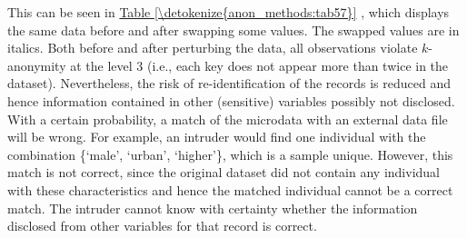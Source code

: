 \documentclass[letterpaper,10pt,english]{sphinxmanual}
\begin{document}
This can be seen in \hyperref[\detokenize{anon_methods:tab57}]{Table \ref{\detokenize{anon_methods:tab57}}}
, which displays the same data before and after swapping some values.
The swapped values are in italics. Both before and after perturbing the
data, all observations violate \(k\)-anonymity at the level 3 (i.e.,
each key does not appear more than twice in the dataset). Nevertheless,
the risk of  re-identification of the records is reduced and
hence information contained in other (sensitive) variables possibly not
disclosed. With a certain probability, a match of the microdata with an
external data file will be wrong. For example, an intruder would find
one individual with the combination \{‘male’, ‘urban’, ‘higher’\}, which
is a sample unique. However, this match is not correct, since the
original dataset did not contain any individual with these
characteristics and hence the matched individual cannot be a correct
match. The intruder cannot know with certainty whether the information
disclosed from other variables for that record is correct.
\end{document}
